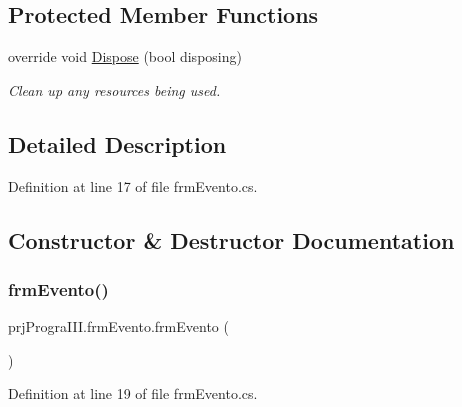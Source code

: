 \subsection*{Protected Member Functions}
\begin{DoxyCompactItemize}
\item 
override void \hyperlink{classprj_progra_i_i_i_1_1frm_evento_a3f617c2ea8998d6fdc25076232c28a36}{Dispose} (bool disposing)
\begin{DoxyCompactList}\small\item\em Clean up any resources being used. \end{DoxyCompactList}\end{DoxyCompactItemize}


\subsection{Detailed Description}


Definition at line 17 of file frm\+Evento.\+cs.



\subsection{Constructor \& Destructor Documentation}
\hypertarget{classprj_progra_i_i_i_1_1frm_evento_a225e472e6e6ff9d1741b262137bd9c83}{}\label{classprj_progra_i_i_i_1_1frm_evento_a225e472e6e6ff9d1741b262137bd9c83} 
\subsubsection{\texorpdfstring{frm\+Evento()}{frmEvento()}}
{\footnotesize\ttfamily prj\+Progra\+I\+I\+I.\+frm\+Evento.\+frm\+Evento (\begin{DoxyParamCaption}{ }\end{DoxyParamCaption})}



Definition at line 19 of file frm\+Evento.\+cs.

